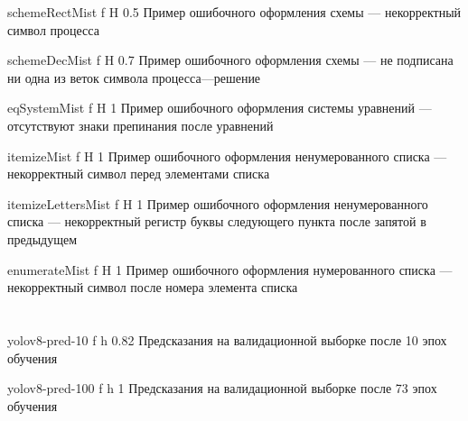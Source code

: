 \begin{appendices}
{schemeRectMist} %
{f} %
{H} %
{0.5\textwidth} %
{Пример ошибочного оформления схемы --- некорректный символ процесса} %

{schemeDecMist} %
{f} %
{H} %
{0.7\textwidth} %
{Пример ошибочного оформления схемы --- не подписана ни одна из веток символа процесса---решение} %

{eqSystemMist} %
{f} %
{H} %
{1\textwidth} %
{Пример ошибочного оформления системы уравнений --- отсутствуют знаки препинания после уравнений} %

{itemizeMist} %
{f} %
{H} %
{1\textwidth} %
{Пример ошибочного оформления ненумерованного списка --- некорректный символ перед элементами списка} %

{itemizeLettersMist} %
{f} %
{H} %
{1\textwidth} %
{Пример ошибочного оформления ненумерованного списка --- некорректный регистр буквы следующего пункта после запятой в предыдущем} %

{enumerateMist} %
{f} %
{H} %
{1\textwidth} %
{Пример ошибочного оформления нумерованного списка --- некорректный символ после номера элемента списка} %



\chapter{}
{yolov8-pred-10} %
{f} %
{h} %
{0.82\textwidth} %
{Предсказания на валидационной выборке после 10 эпох обучения} %


{yolov8-pred-100} %
{f} %
{h} %
{1\textwidth} %
{Предсказания на валидационной выборке после 73 эпох обучения} %

\end{appendices}